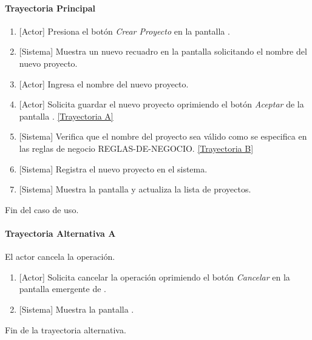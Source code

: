 \paragraph{Trayectoria Principal}
\label{CUA_Crear_Proyecto}
	\begin{enumerate}
	    \item {[Actor]} Presiona el botón \textit{Crear Proyecto} en la pantalla \textbf{}.
	    
	    \item {[Sistema]} Muestra un nuevo recuadro en la pantalla \textbf{} solicitando el nombre del nuevo proyecto.
	    
	    \item {[Actor]} Ingresa el nombre del nuevo proyecto.
	    
	    \item {[Actor]} Solicita guardar el nuevo proyecto oprimiendo el botón \textit{Aceptar} de la pantalla \textbf{}. \hyperref[A-PR-CU1.2:TA]{[Trayectoria A]}
	    
	    \item {[Sistema]} Verifica que el nombre del proyecto sea válido como se especifica en las reglas de negocio REGLAS-DE-NEGOCIO. \hyperref[A-PR-CU1.2:TB]{[Trayectoria B]}
	    
	    \item {[Sistema]} Registra el nuevo proyecto en el sistema.
	    
	    \item {[Sistema]} Muestra la pantalla \textbf{} y actualiza la lista de proyectos.

	\end{enumerate}
	Fin del caso de uso.
	
\paragraph{Trayectoria Alternativa A} \label{A-PR-CU1.2:TA}
	El actor cancela la operación.
	\begin{enumerate}[label=A\arabic*.]
		\item {[Actor]} Solicita cancelar la operación oprimiendo el botón \textit{Cancelar} en la pantalla emergente de \textbf{}.
		\item {[Sistema]} Muestra la pantalla \textbf{}.
	\end{enumerate}
	Fin de la trayectoria alternativa.

